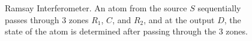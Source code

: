 \begin{figure}
\centering



\caption{Ramsay Interferometer. An atom from the source $S$ sequentially
  passes through 3 zones $R_1$, $C$, and $R_2$, and at the output $D$, the state of the atom is determined after passing through the 3 zones.}
\label{figPart1RamsiInterferometer}
\end{figure}